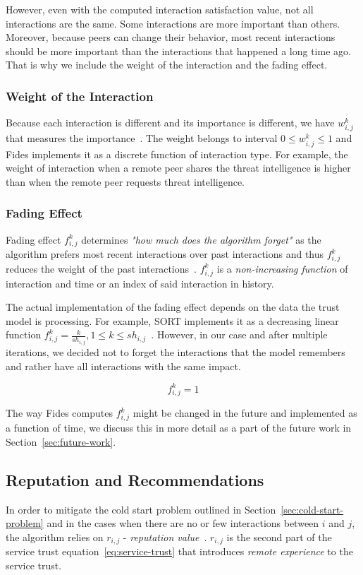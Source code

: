 However, even with the computed interaction satisfaction value, not all interactions are the same. 
Some interactions are more important than others. 
Moreover, because peers can change their behavior, most recent interactions should be more important than the interactions that happened a long time ago.
That is why we include the weight of the interaction and the fading effect.

\subsubsection{Weight of the Interaction}
Because each interaction is different and its importance is different, we have $w^{k}_{i,j}$ that measures the importance~\cite{sort}.
The weight belongs to interval $0 \leq w^{k}_{i,j} \leq 1$ and Fides implements it as a discrete function of interaction type. 
For example, the weight of interaction when a remote peer shares the threat intelligence is higher than when the remote peer requests threat intelligence.


\subsubsection{Fading Effect}
\label{subsubsec:fading-effect}
Fading effect $f^{k}_{i,j}$ determines \textit{"how much does the algorithm forget"} as the algorithm prefers most recent interactions over past interactions and thus $f^{k}_{i,j}$ reduces the weight of the past interactions~\cite{sort}. 
$f^{k}_{i,j}$ is a \textit{non-increasing function} of interaction and time or an index of said interaction in history.

The actual implementation of the fading effect depends on the data the trust model is processing.
For example, SORT implements it as a decreasing linear function $f^{k}_{i,j} = \frac{k}{sh_{i,j}}, 1 \leq k \leq sh_{i,j}$~\cite{sort}.
However, in our case and after multiple iterations, we decided not to forget the interactions that the model remembers and rather have all interactions with the same impact.

\begin{equation}
    f^{k}_{i,j} =1
\end{equation}

\noindent
The way Fides computes $f^{k}_{i,j}$ might be changed in the future and implemented as a function of time, we discuss this in more detail as a part of the future work in Section~\ref{sec:future-work}.

\subsection{Reputation and Recommendations}
In order to mitigate the cold start problem outlined in Section~\ref{sec:cold-start-problem} and in the cases when there are no or few interactions between $i$ and $j$, the algorithm relies on $r_{i,j}$ - \textit{reputation value}~\cite{sort}.
$r_{i,j}$ is the second part of the service trust equation~\ref{eq:service-trust} that introduces \textit{remote experience} to the service trust.


